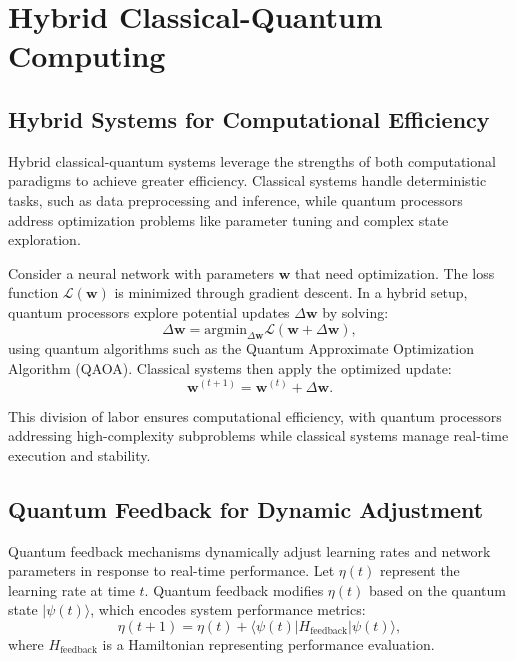 \documentclass{article}
\theoremstyle{plain}
\begin{document}
\section{Hybrid Classical-Quantum Computing}

\subsection{Hybrid Systems for Computational Efficiency}
Hybrid classical-quantum systems leverage the strengths of both computational paradigms to achieve greater efficiency. Classical systems handle deterministic tasks, such as data preprocessing and inference, while quantum processors address optimization problems like parameter tuning and complex state exploration.

Consider a neural network with parameters \( \mathbf{w} \) that need optimization. The loss function \( \mathcal{L}(\mathbf{w}) \) is minimized through gradient descent. In a hybrid setup, quantum processors explore potential updates \( \Delta \mathbf{w} \) by solving:
\begin{equation}
\Delta \mathbf{w} = \text{argmin}_{\Delta \mathbf{w}} \mathcal{L}(\mathbf{w} + \Delta \mathbf{w}),
\end{equation}
using quantum algorithms such as the Quantum Approximate Optimization Algorithm (QAOA). Classical systems then apply the optimized update:
\begin{equation}
\mathbf{w}^{(t+1)} = \mathbf{w}^{(t)} + \Delta \mathbf{w}.
\end{equation}

This division of labor ensures computational efficiency, with quantum processors addressing high-complexity subproblems while classical systems manage real-time execution and stability.

\subsection{Quantum Feedback for Dynamic Adjustment}
Quantum feedback mechanisms dynamically adjust learning rates and network parameters in response to real-time performance. Let \( \eta(t) \) represent the learning rate at time \( t \). Quantum feedback modifies \( \eta(t) \) based on the quantum state \( |\psi(t)\rangle \), which encodes system performance metrics:
\begin{equation}
\eta(t+1) = \eta(t) + \langle \psi(t) | H_{\text{feedback}} | \psi(t) \rangle,
\end{equation}
where \( H_{\text{feedback}} \) is a Hamiltonian representing performance evaluation.
\end{document}
